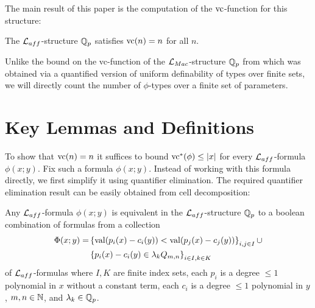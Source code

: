 \documentclass{amsart}
\begin{document}
The main result of this paper is the computation of the $\operatorname{vc}$-function for this structure:
\begin{Theorem} \label{main_theorem}
  The $\mathcal L_{aff}$-structure $\mathbb{Q}_p$ satisfies $\operatorname{vc}(n) = n$ for all $n$.
\end{Theorem}
 
Unlike the bound on the vc-function of the $\mathcal L_{Mac}$-structure $\mathbb{Q}_p$ from \cite{density}
which was obtained via a quantified version of uniform definability of types over finite sets,
we will directly count the number of $\phi$-types over a finite set of parameters.


\section{Key Lemmas and Definitions}
To show that $\operatorname{vc}(n) = n$ it suffices to bound $\operatorname{vc}^*(\phi) \leq |x|$ for every $\mathcal L_{aff}$-formula $\phi(x; y)$.
Fix such a formula $\phi(x; y)$.
Instead of working with this formula directly, we first simplify it using quantifier elimination.
The required quantifier elimination result can be easily obtained from cell decomposition:
\begin{Lemma} \label {quantifier_elimination}
  Any $\mathcal L_{aff}$-formula $\phi(x; y)$ is equivalent in the $\mathcal L_{aff}$-structure $\mathbb{Q}_p$ to a boolean combination of formulas from a collection
  \begin{align*}
    \Phi(x; y) = &\left\{\operatorname{val} (p_i(x) - c_i(y)) < \operatorname{val} (p_j(x) - c_j(y))\right\}_{i, j \in I} \cup \\
                 &\left\{p_i(x) - c_i(y) \in \lambda_k Q_{m,n}\right\}_{i \in I , k \in K}
  \end{align*}
  of $\mathcal L_{aff}$-formulas
  where $I, K$ are finite index sets,
  each $p_i$ is a degree $\leq 1$ polynomial in $x$ without a constant term,
  each $c_i$ is a degree $\leq 1$ polynomial in $y$,
  $m,n \in \mathbb{N}$,
  and
  $\lambda_k \in \mathbb{Q}_p$.
\end{Lemma}
\end{document}
